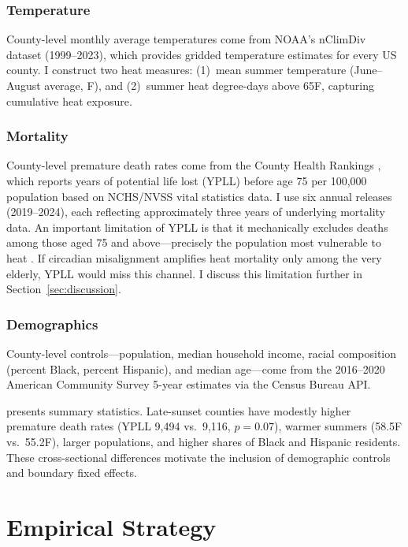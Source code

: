 \documentclass[12pt]{article}
\begin{document}
\subsubsection*{Temperature} County-level monthly average temperatures come from NOAA's nClimDiv dataset (1999--2023), which provides gridded temperature estimates for every US county. I construct two heat measures: (1)~mean summer temperature (June--August average, \textdegree{}F), and (2)~summer heat degree-days above 65\textdegree{}F, capturing cumulative heat exposure.

\subsubsection*{Mortality} County-level premature death rates come from the County Health Rankings \citep{chr2024}, which reports years of potential life lost (YPLL) before age 75 per 100,000 population based on NCHS/NVSS vital statistics data. I use six annual releases (2019--2024), each reflecting approximately three years of underlying mortality data. An important limitation of YPLL is that it mechanically excludes deaths among those aged 75 and above---precisely the population most vulnerable to heat \citep{deschenes2011climate, carleton2022valuing}. If circadian misalignment amplifies heat mortality only among the very elderly, YPLL would miss this channel. I discuss this limitation further in Section~\ref{sec:discussion}.

\subsubsection*{Demographics} County-level controls---population, median household income, racial composition (percent Black, percent Hispanic), and median age---come from the 2016--2020 American Community Survey 5-year estimates via the Census Bureau API.



 presents summary statistics. Late-sunset counties have modestly higher premature death rates (YPLL 9,494 vs.\ 9,116, $p = 0.07$), warmer summers (58.5\textdegree{}F vs.\ 55.2\textdegree{}F), larger populations, and higher shares of Black and Hispanic residents. These cross-sectional differences motivate the inclusion of demographic controls and boundary fixed effects.


\section{Empirical Strategy}
\label{sec:strategy}
\end{document}
